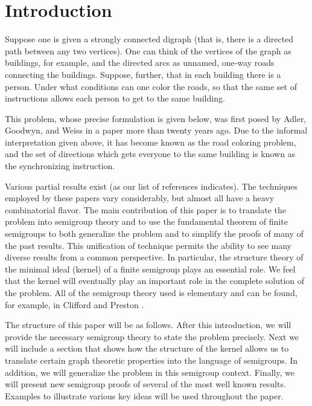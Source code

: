 

\section{Introduction}  
\label{sec:4.1}

Suppose one is given a strongly connected digraph (that is, there is a directed path between any two vertices).  
One can think of the vertices of the graph as buildings, for example, and the directed arcs as unnamed, one-way roads connecting the buildings. 
Suppose, further, that in each building there is a person. 
Under what conditions can one color the roads, so that the same set of instructions allows each person to get to the same building.

This problem, whose precise formulation is given below, was first posed by
Adler, Goodwyn, and Weiss \cite{AGW} in a paper more than twenty years ago. 
Due to the informal interpretation given above, it has become known as the road coloring problem, and the set of directions which gets everyone to the same building is known as the synchronizing instruction.  

Various partial results exist (as our list of references indicates). 
The techniques employed by these papers vary considerably, but almost all have a heavy combinatorial flavor. 
The main contribution of this paper is to translate the problem into semigroup theory and to use the fundamental theorem of finite semigroups to both generalize the problem and to simplify the proofs of many of the past results. 
This unification of technique permits the ability to see many diverse results from a common perspective. In particular, the structure theory of the minimal ideal (kernel) of a finite semigroup plays an essential role. 
We feel that the kernel will eventually play an important role in the complete solution of the problem. 
All of the semigroup theory used is elementary and can be found, for example, in Clifford and Preston \cite{CP}.

The structure of this paper will be as follows. 
After this introduction, we will provide the necessary semigroup theory to state the problem precisely. 
Next we will include a section that shows how the structure of the kernel allows us to translate certain graph theoretic properties  into the language of semigroups. 
In addition, we will generalize the problem in this semigroup context. 
Finally, we will present new semigroup proofs of several of the most well known results.
Examples to illustrate various key ideas will be used throughout the paper.
